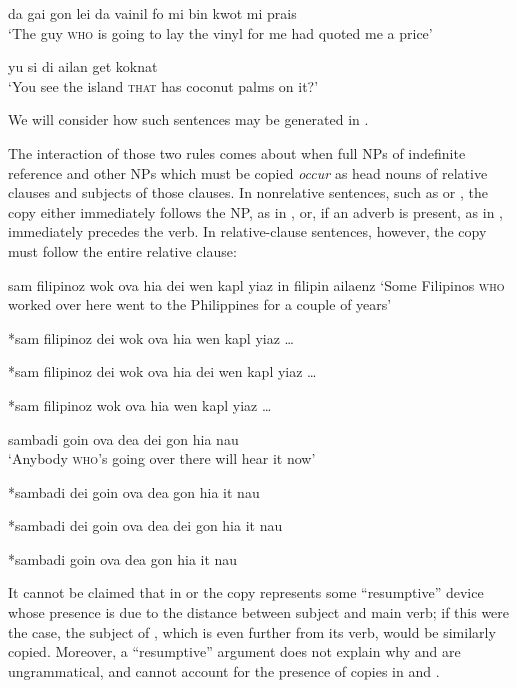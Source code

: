 \ea\label{ex:73}
 da gai gon lei da vainil fo mi bin kwot mi prais\\
\glt  `The guy \textsc{who} is going to lay the vinyl for me had quoted me a price'
\z

\ea\label{ex:74}
yu si di ailan get koknat\\
\glt `You see the island \textsc{that} has coconut palms on it?'
\z

\noindent We will consider how such sentences may be generated in .

The interaction of those two rules comes about when full NPs of indefinite reference and other NPs which must be copied \textit{occur} as head nouns of relative clauses and subjects of those clauses. In non\-relative sentences, such as  or , the copy either immediately follows the NP, as in , or, if an adverb is present, as in , immediately precedes the verb. In relative-clause sentences, however, the copy must follow the entire relative clause:

\ea\label{ex:75}
 sam filipinoz wok ova hia dei wen kapl yiaz in filipin ailaenz 
\glt `Some Filipinos \textsc{who} worked over here went to the Philippines for a couple of years'
\z

\ea\label{ex:76}
 *sam filipinoz dei wok ova hia wen kapl yiaz \ldots
\z

\ea\label{ex:77}
*sam filipinoz dei wok ova hia dei wen kapl yiaz \ldots
\z

\ea\label{ex:78}
 *sam filipinoz wok ova hia wen kapl yiaz \ldots
\z

\ea\label{ex:79}
sambadi goin ova dea dei gon hia nau\\
\glt `Anybody \textsc{who}'s going over there will hear it now'
\z

\ea\label{ex:80}
 *sambadi dei goin ova dea gon hia it nau 
\z

\ea\label{ex:81}
 *sambadi dei goin ova dea dei gon hia it nau 
\z

\ea\label{ex:82}
 *sambadi goin ova dea gon hia it nau 
\z

It cannot be claimed that in  or  the copy represents some ``resumptive'' device whose presence is due to the distance be\-tween subject and main verb; if this were the case, the subject of , which is even further from its verb, would be similarly copied. More\-over, a ``resumptive'' argument does not explain why  and  are ungrammatical, and cannot account for the presence of copies in
 and .

